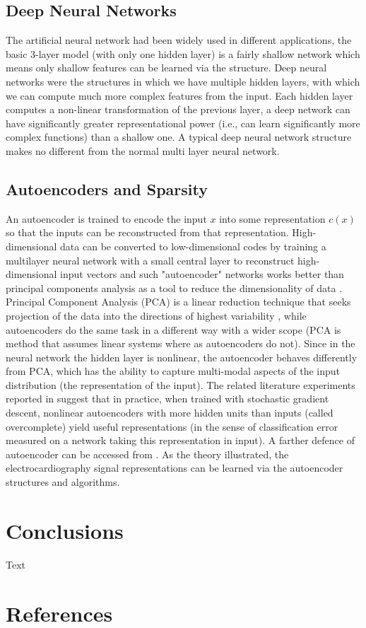 \documentclass{bmcart}
\begin{document}
\subsection*{Deep Neural Networks}
The artificial neural network had been widely used in different applications, the basic 3-layer model (with only one hidden layer) is a fairly shallow network which means only shallow features can be learned via the structure. Deep neural networks were the structures in which we have multiple hidden layers, with which we can compute much more complex features from the input. Each hidden layer computes a non-linear transformation of the previous layer, a deep network can have significantly greater representational power (i.e., can learn significantly more complex functions) than a shallow one. A typical deep neural network structure makes no different from the normal multi layer neural network.

\subsection*{Autoencoders and Sparsity}
An autoencoder is trained to encode the input $x$ into some representation $c(x)$ so that the inputs can be reconstructed from that representation. High-dimensional data can be converted to low-dimensional codes by training a multilayer neural network with a small central layer to reconstruct high-dimensional input vectors and such "autoencoder" networks works better than principal components analysis as a tool to reduce the dimensionality of data \cite{hinton2006reducing}. Principal Component Analysis (PCA) is a linear reduction technique that seeks projection of the data into the directions of highest variability \cite{duda2012pattern}, while autoencoders do the same task in a different way with a wider scope (PCA is method that assumes linear systems where as autoencoders do not). Since in the neural network the hidden layer is nonlinear, the autoencoder behaves differently from PCA, which has the ability to capture multi-modal aspects of the input distribution (the representation of the input). The related literature experiments reported in \cite{bengio2007greedy} suggest that in practice, when trained with stochastic gradient descent, nonlinear autoencoders with more hidden units than inputs (called overcomplete) yield useful representations (in the sense of classification error measured on a network taking this representation in input). A farther defence of autoencoder can be accessed from \cite{bengio2009learning}. As the theory illustrated, the electrocardiography signal representations can be learned via the autoencoder structures and algorithms.







\section*{Conclusions}
Text

\section*{References}
\end{document}

